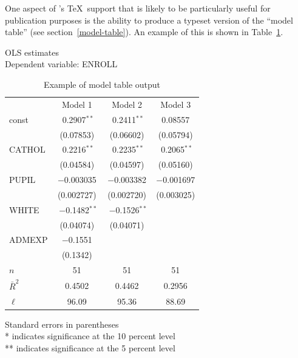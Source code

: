 One aspect of 's \TeX\ support that is likely to be
particularly useful for publication purposes is the ability to produce
a typeset version of the ``model table'' (see
section~\ref{model-table}).  An example of this is shown in
Table~\ref{tab:modeltab}.

\begin{table}[htbp]
\caption{Example of model table output}
\label{tab:modeltab}
\begin{center}
OLS estimates\\
Dependent variable: ENROLL \\
\vspace{1em}

\begin{tabular}{lccc}
 & Model 1  & Model 2  & Model 3 \\  [6pt] 
const & $\,\,$0.2907$^{**}$ & $\,\,$0.2411$^{**}$ & 0.08557 \\
& \footnotesize{(0.07853)} & \footnotesize{(0.06602)} & \footnotesize{(0.05794)} \\ [4pt] 
CATHOL & $\,\,$0.2216$^{**}$ & $\,\,$0.2235$^{**}$ & $\,\,$0.2065$^{**}$ \\
& \footnotesize{(0.04584)} & \footnotesize{(0.04597)} & \footnotesize{(0.05160)} \\ [4pt] 
PUPIL & $-$0.003035 & $-$0.003382 & $-$0.001697 \\
& \footnotesize{(0.002727)} & \footnotesize{(0.002720)} & \footnotesize{(0.003025)} \\ [4pt] 
WHITE & $\,\,$$-$0.1482$^{**}$ & $\,\,$$-$0.1526$^{**}$ & \\
& \footnotesize{(0.04074)} & \footnotesize{(0.04071)} & \\ [4pt] 
ADMEXP & $-$0.1551 & & \\
& \footnotesize{(0.1342)} & & \\ [4pt] 
$n$ & 51 & 51 & 51 \\
$\bar R^2$ & 0.4502 & 0.4462 & 0.2956 \\
$\ell$ & 96.09 & 95.36 & 88.69 \\
\end{tabular}

\vspace{1em}
Standard errors in parentheses\\
{}* indicates significance at the 10 percent level\\
{}** indicates significance at the 5 percent level\\
\end{center}
\end{table}


